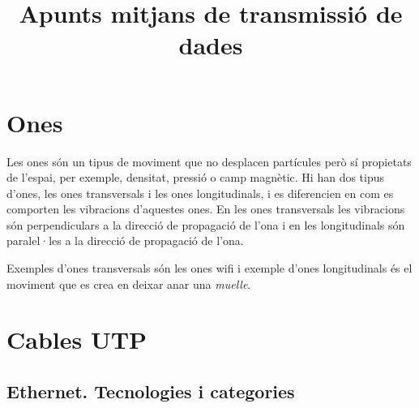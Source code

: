 \documentclass[a4paper]{article}
\begin{document}
\title{Apunts mitjans de transmissió de dades}
\maketitle

 
%

\begin{comment}
oddsidemargin \the\oddsidemargin \newline
textwidth \the\textwidth \newline
marginparsep \the\marginparsep \newline
marginparwidth \the\marginparwidth \newline
hoffset \the\hoffset \newline
paperwidth \the\paperwidth 
\end{comment}

\section{Ones}
Les ones són un tipus de moviment que no desplacen partícules però sí propietats de l'espai, per exemple, densitat, pressió o camp magnètic. Hi han dos tipus d'ones, les ones transversals i les ones longitudinals, i es diferencien en com es comporten les vibracions d'aquestes ones. En les ones transversals les vibracions són perpendiculars a la direcció de propagació de l'ona i en les longitudinals són paralel·les a la direcció de propagació de l'ona.

Exemples d'ones transversals són les ones wifi i exemple d'ones longitudinals \'{e}s el moviment que es crea en deixar anar una \textit{muelle}.

\section{Cables UTP}
\subsection{Ethernet. Tecnologies i categories}
\end{document}
